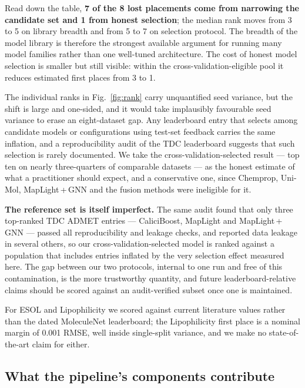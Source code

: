 Read down the table, \textbf{7 of the 8 lost placements come from narrowing the candidate set and 1 from honest selection}; the median rank moves from 3 to 5 on library breadth and from 5 to 7 on selection protocol. The breadth of the model library is therefore the strongest available argument for running many model families rather than one well-tuned architecture. The cost of honest model selection is smaller but still visible: within the cross-validation-eligible pool it reduces estimated first places from 3 to 1.

The individual ranks in Fig.~\ref{fig:rank} carry unquantified seed variance, but the shift is large and one-sided, and it would take implausibly favourable seed variance to erase an eight-dataset gap. Any leaderboard entry that selects among candidate models or configurations using test-set feedback carries the same inflation, and a reproducibility audit of the TDC leaderboard \cite{koleiev2026critical} suggests that such selection is rarely documented. We take the cross-validation-selected result --- top ten on nearly three-quarters of comparable datasets --- as the honest estimate of what a practitioner should expect, and a conservative one, since Chemprop, Uni-Mol, MapLight\,+\,GNN and the fusion methods were ineligible for it.

\textbf{The reference set is itself imperfect.} The same audit found that only three top-ranked TDC ADMET entries --- CaliciBoost, MapLight and MapLight\,+\,GNN --- passed all reproducibility and leakage checks, and reported data leakage in several others, so our cross-validation-selected model is ranked against a population that includes entries inflated by the very selection effect measured here. The gap between our two protocols, internal to one run and free of this contamination, is the more trustworthy quantity, and future leaderboard-relative claims should be scored against an audit-verified subset once one is maintained.

For ESOL and Lipophilicity we scored against current literature values rather than the dated MoleculeNet leaderboard; the Lipophilicity first place is a nominal margin of 0.001 RMSE, well inside single-split variance, and we make no state-of-the-art claim for either.

\subsection{What the pipeline's components contribute}\label{sec:components}

